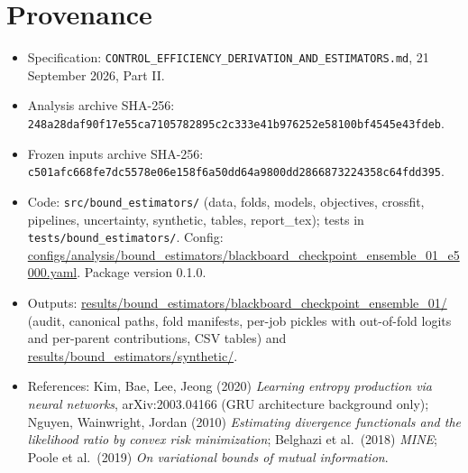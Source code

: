 \documentclass[10pt]{article}
\begin{document}
\section{Provenance}
\begin{itemize}\footnotesize
\item Specification: \texttt{CONTROL\_EFFICIENCY\_DERIVATION\_AND\_ESTIMATORS.md}, 21 September 2026, Part II.
\item Analysis archive SHA-256: \texttt{248a28daf90f17e55ca7105782895c2c333e41b976252e58100bf4545e43fdeb}.
\item Frozen inputs archive SHA-256: \texttt{c501afc668fe7dc5578e06e158f6a50dd64a9800dd2866873224358c64fdd395}.
\item Code: \texttt{src/bound\_estimators/} (data, folds, models, objectives, crossfit, pipelines, uncertainty, synthetic, tables, report\_tex); tests in \texttt{tests/bound\_estimators/}. Config: \url{configs/analysis/bound_estimators/blackboard_checkpoint_ensemble_01_e5000.yaml}. Package version 0.1.0.
\item Outputs: \url{results/bound_estimators/blackboard_checkpoint_ensemble_01/} (audit, canonical paths, fold manifests, per-job pickles with out-of-fold logits and per-parent contributions, CSV tables) and \url{results/bound_estimators/synthetic/}.
\item References: Kim, Bae, Lee, Jeong (2020) \emph{Learning entropy production via neural networks}, arXiv:2003.04166 (GRU architecture background only); Nguyen, Wainwright, Jordan (2010) \emph{Estimating divergence functionals and the likelihood ratio by convex risk minimization}; Belghazi et al.\ (2018) \emph{MINE}; Poole et al.\ (2019) \emph{On variational bounds of mutual information}.
\end{itemize}
\end{document}
